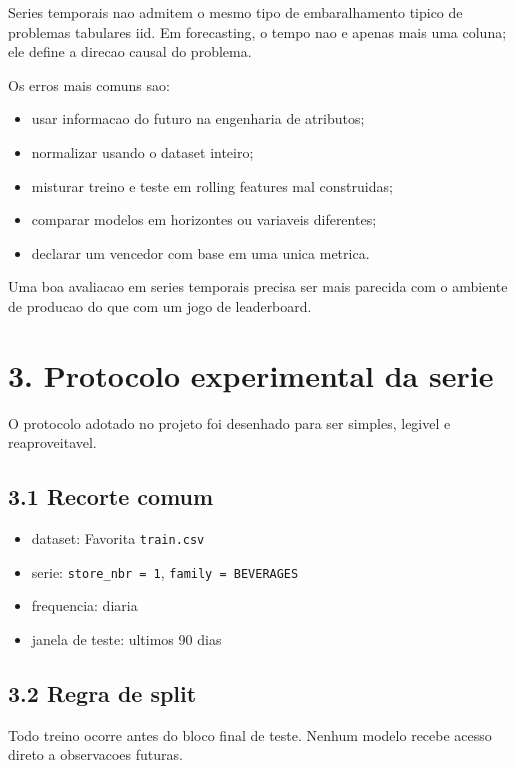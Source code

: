 \documentclass[12pt]{article}
\providecommand{\tightlist}{%
  \setlength{\itemsep}{0pt}\setlength{\parskip}{0pt}}
\begin{document}
Series temporais nao admitem o mesmo tipo de embaralhamento tipico de problemas tabulares iid. Em forecasting, o tempo nao e apenas mais uma coluna; ele define a direcao causal do problema.

Os erros mais comuns sao:

\begin{itemize}
\tightlist
\item
  usar informacao do futuro na engenharia de atributos;
\item
  normalizar usando o dataset inteiro;
\item
  misturar treino e teste em rolling features mal construidas;
\item
  comparar modelos em horizontes ou variaveis diferentes;
\item
  declarar um vencedor com base em uma unica metrica.
\end{itemize}

Uma boa avaliacao em series temporais precisa ser mais parecida com o ambiente de producao do que com um jogo de leaderboard.

\section{3. Protocolo experimental da serie}\label{3-protocolo-experimental-da-serie}

O protocolo adotado no projeto foi desenhado para ser simples, legivel e reaproveitavel.

\subsection{3.1 Recorte comum}\label{31-recorte-comum}

\begin{itemize}
\tightlist
\item
  dataset: Favorita \texttt{train.csv}
\item
  serie: \texttt{store\_nbr\ =\ 1}, \texttt{family\ =\ BEVERAGES}
\item
  frequencia: diaria
\item
  janela de teste: ultimos 90 dias
\end{itemize}

\subsection{3.2 Regra de split}\label{32-regra-de-split}

Todo treino ocorre antes do bloco final de teste. Nenhum modelo recebe acesso direto a observacoes futuras.
\end{document}
